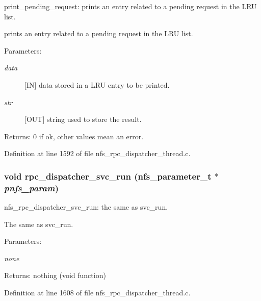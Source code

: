 print\_\-pending\_\-request: prints an entry related to a pending request in the LRU list.

prints an entry related to a pending request in the LRU list.

\begin{Desc}
\item[Parameters:]
\begin{description}
\item[{\em data}][IN] data stored in a LRU entry to be printed. \item[{\em str}][OUT] string used to store the result.\end{description}
\end{Desc}
\begin{Desc}
\item[Returns:]0 if ok, other values mean an error. \end{Desc}


Definition at line 1592 of file nfs\_\-rpc\_\-dispatcher\_\-thread.c.
\subsubsection[{rpc\_\-dispatcher\_\-svc\_\-run}]{\setlength{\rightskip}{0pt plus 5cm}void rpc\_\-dispatcher\_\-svc\_\-run (nfs\_\-parameter\_\-t $\ast$ {\em pnfs\_\-param})}\label{nfs__rpc__dispatcher__thread_8c_6eb51d2ceaa2943d99cb326f9b3d9968}


nfs\_\-rpc\_\-dispatcher\_\-svc\_\-run: the same as svc\_\-run.

The same as svc\_\-run.

\begin{Desc}
\item[Parameters:]
\begin{description}
\item[{\em none}]\end{description}
\end{Desc}
\begin{Desc}
\item[Returns:]nothing (void function) \end{Desc}


Definition at line 1608 of file nfs\_\-rpc\_\-dispatcher\_\-thread.c.
